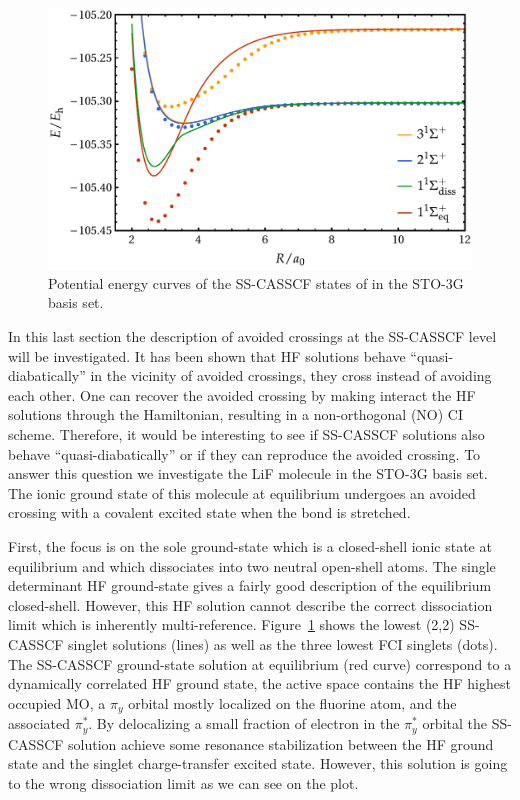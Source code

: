 \documentclass[aip,jcp,reprint,noshowkeys,superscriptaddress]{revtex4-1}
\begin{document}
\begin{figure}
  \centering
  \includegraphics[width=0.9\linewidth]{Figures/fig_7.pdf}
  \caption{Potential energy curves of the SS-CASSCF states of  in the STO-3G basis set. \label{fig:fig_9}}
\end{figure}

In this last section the description of avoided crossings at the SS-CASSCF level will be investigated.
It has been shown that HF solutions behave ``quasi-diabatically'' in the vicinity of avoided crossings, \ie they cross instead of avoiding each other. \cite{Thom_2009}
One can recover the avoided crossing by making interact the HF solutions through the Hamiltonian, resulting in a non-orthogonal (NO) CI scheme. \cite{Burton_2019}
Therefore, it would be interesting to see if SS-CASSCF solutions also behave ``quasi-diabatically'' or if they can reproduce the avoided crossing.
To answer this question we investigate the LiF molecule in the STO-3G basis set.
The ionic ground state of this molecule at equilibrium undergoes an avoided crossing with a covalent excited state when the bond is stretched. \cite{Bauschlicher_1988,Thom_2009,Mahler_2021}

First, the focus is on the sole ground-state which is a closed-shell ionic state at equilibrium and which dissociates into two neutral open-shell atoms.
The single determinant HF ground-state gives a fairly good description of the equilibrium closed-shell.
However, this HF solution cannot describe the correct dissociation limit which is inherently multi-reference. \cite{Thom_2009}
Figure~\ref{fig:fig_9} shows the lowest (2,2) SS-CASSCF singlet solutions (lines) as well as the three lowest FCI singlets (dots).
The SS-CASSCF ground-state solution at equilibrium (red curve) correspond to a dynamically correlated HF ground state, \ie the active space contains the HF highest occupied MO, a $\pi_y$ orbital mostly localized on the fluorine atom, and the associated $\pi_y^*$.
By delocalizing a small fraction of electron in the $\pi_y^*$ orbital the SS-CASSCF solution achieve some resonance stabilization between the HF ground state and the singlet charge-transfer excited state.
However, this solution is going to the wrong dissociation limit as we can see on the plot.
\end{document}
